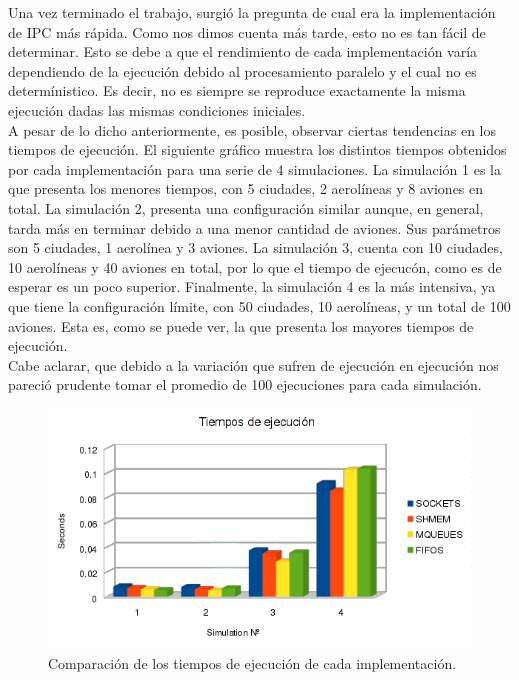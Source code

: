 \documentclass[a4paper,10pt]{article}
\begin{document}
Una vez terminado el trabajo, surgió la pregunta de cual era la implementación de IPC más rápida. Como nos dimos cuenta más tarde, esto no es tan fácil de determinar. 
Esto se debe a que el rendimiento de cada implementación varía dependiendo de la ejecución debido al procesamiento paralelo y el cual no es determínistico. Es decir, no 
es siempre se reproduce exactamente la misma ejecución dadas las mismas condiciones iniciales. \\
A pesar de lo dicho anteriormente, es posible, observar ciertas tendencias en los tiempos de ejecución. El siguiente gráfico muestra los distintos tiempos obtenidos por 
cada implementación para una serie de 4 simulaciones. La simulación 1 es la que presenta los menores tiempos, con 5 ciudades, 2 aerolíneas y 8 aviones en total.
La simulación 2, presenta una configuración similar aunque, en general, tarda más en terminar debido a una menor cantidad de aviones. Sus parámetros son
5 ciudades, 1 aerolínea y 3 aviones. La simulación 3, cuenta con 10 ciudades, 10 aerolíneas y 40 aviones en total, por lo que el tiempo de ejecucón, como es de 
esperar es un poco superior. Finalmente, la simulación 4 es la más intensiva, ya que tiene la configuración límite, con 50 ciudades, 10 aerolíneas, y un total de
100 aviones. Esta es, como se puede ver, la que presenta los mayores tiempos de ejecución.\\
Cabe aclarar, que debido a la variación que sufren de ejecución en ejecución nos pareció prudente tomar el promedio de 100 ejecuciones para cada simulación. 

\begin{figure}[H]
\begin{center}
 \includegraphics[scale=0.75]{./images/runningTimesChart.png}
  \caption{Comparación de los tiempos de ejecución de cada implementación.}
\end{center}
\end{figure}
\end{document}
